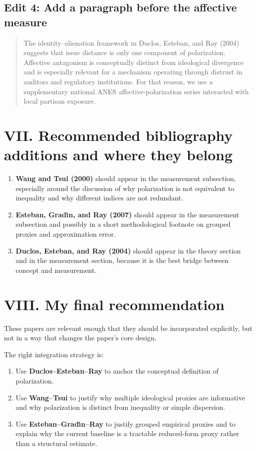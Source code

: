 \documentclass[12pt]{article}
\begin{document}
\subsection*{Edit 4: Add a paragraph before the affective measure}
\begin{quote}
The identity--alienation framework in Duclos, Esteban, and Ray (2004) suggests that issue distance is only one component of polarization. Affective antagonism is conceptually distinct from ideological divergence and is especially relevant for a mechanism operating through distrust in auditors and regulatory institutions. For that reason, we use a supplementary national ANES affective-polarization series interacted with local partisan exposure.
\end{quote}

\section*{VII. Recommended bibliography additions and where they belong}
\begin{enumerate}[label=\arabic*.]
    \item \textbf{Wang and Tsui (2000)} should appear in the measurement subsection, especially around the discussion of why polarization is not equivalent to inequality and why different indices are not redundant.
    \item \textbf{Esteban, Grad\'{\i}n, and Ray (2007)} should appear in the measurement subsection and possibly in a short methodological footnote on grouped proxies and approximation error.
    \item \textbf{Duclos, Esteban, and Ray (2004)} should appear in the theory section and in the measurement section, because it is the best bridge between concept and measurement.
\end{enumerate}

\section*{VIII. My final recommendation}
These papers are relevant enough that they should be incorporated explicitly, but not in a way that changes the paper's core design.

The right integration strategy is:
\begin{enumerate}[label=\arabic*.]
    \item Use \textbf{Duclos--Esteban--Ray} to anchor the conceptual definition of polarization.
    \item Use \textbf{Wang--Tsui} to justify why multiple ideological proxies are informative and why polarization is distinct from inequality or simple dispersion.
    \item Use \textbf{Esteban--Grad\'{\i}n--Ray} to justify grouped empirical proxies and to explain why the current baseline is a tractable reduced-form proxy rather than a structural estimate.
\end{enumerate}
\end{document}
